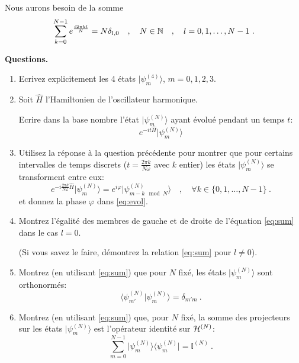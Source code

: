 Nous aurons besoin de la somme 
\begin{equation}
\sum_{k=0}^{N-1} e^{\frac{i 2 \pi  k l}{N}}=N\delta_{l,0} \quad , \quad N\in \mathbb{N}  \quad , \quad  l=0,1,\dotsc,N-1\ .\\
\label{eq:sum}
\end{equation}


{\bf Questions.}

\begin{enumerate}



\item

Ecrivez explicitement les 4 états $\lvert \psi^{(4)}_m\rangle$, $m=0,1,2,3$.


\item


Soit $\hat H$  l'Hamiltonien de l'oscillateur harmonique.

Ecrire dans la base nombre l'état $\lvert \psi^{(N)}_m\rangle$ ayant évolué pendant un temps $t$:
\begin{equation}
e^{-i t \hat H} \lvert \psi^{(N)}_m\rangle
\end{equation}

\item
\label{poin5}

Utilisez la réponse à la question précédente pour montrer que pour certains intervalles de temps discrets ($t={\frac{ 2 \pi k}{N \omega}}$ avec $k$ entier) les états $\lvert \psi^{(N)}_m\rangle$ se transforment entre eux:
\begin{equation}
e^{-i \frac{ 2 \pi k}{N \omega}\hat H} \lvert \psi^{(N)}_m\rangle = e^{i\varphi}
\lvert \psi^{(N)}_{{m - k} \mod N}\rangle
 \quad , \quad  \forall k\in \{0,1,\dotsc,N-1\}
\ . \label{eq:evol}
\end{equation}
et donnez la phase $\varphi$ dans \eqref{eq:evol}.

\item 

Montrez l'égalité des membres de gauche et de droite de l'équation \eqref{eq:sum} dans le cas $l=0$.

(Si vous savez le faire, démontrez la relation \eqref{eq:sum}  pour $l\neq 0$).

\item
\label{poin3}

Montrez (en utilisant \eqref{eq:sum}) que pour $N$ fixé, les états $\lvert \psi^{(N)}_m\rangle$ sont orthonormés:
\begin{equation}
\langle \psi^{(N)}_{m'} \vert \psi^{(N)}_m\rangle = \delta_{m' m}\ .
\end{equation}

\item
\label{poin4}

Montrez  (en utilisant \eqref{eq:sum})  que, pour $N$ fixé, la somme des projecteurs sur les états 
$\lvert \psi^{(N)}_m\rangle$  est l'opérateur identité sur ${\cal H}^{(N)}$:
\begin{equation}
\sum_{m=0}^{N-1} \lvert  \psi^{(N)}_{m} \rangle \langle \psi^{(N)}_m\rvert = \mathbb{I}^{(N)}\ .
\end{equation}


\end{enumerate}

